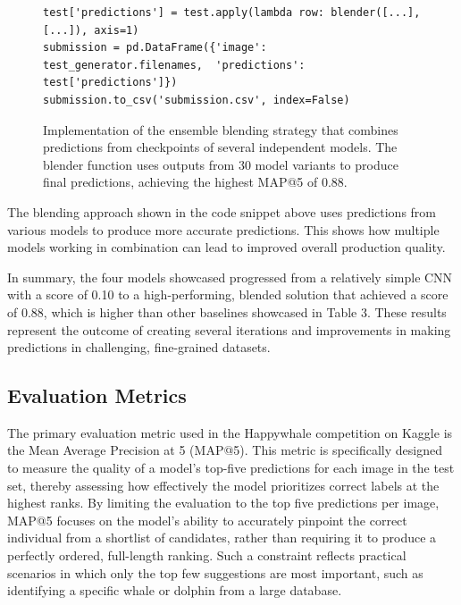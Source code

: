 \documentclass[twocolumn]{article}
\begin{document}
\begin{figure}[h!]
\centering
\begin{minipage}{0.99\linewidth}
\begin{lstlisting}
test['predictions'] = test.apply(lambda row: blender([...], [...]), axis=1)
submission = pd.DataFrame({'image': test_generator.filenames,  'predictions': test['predictions']})
submission.to_csv('submission.csv', index=False)
\end{lstlisting}
\end{minipage}
\caption{Implementation of the ensemble blending strategy that combines predictions from checkpoints of several independent models. The blender function uses outputs from 30 model variants to produce final predictions, achieving the highest MAP@5 of 0.88.}
\end{figure}

The blending approach shown in the code snippet above uses predictions from various models to produce more accurate predictions. This shows how multiple models working in combination can lead to improved overall production quality.

In summary, the four models showcased progressed from a relatively simple CNN with a score of 0.10 to a high-performing, blended solution that achieved a score of 0.88, which is higher than other baselines showcased in Table 3. These results represent the outcome of creating several iterations and improvements in making predictions in challenging, fine-grained datasets.

\subsection{Evaluation Metrics}

The primary evaluation metric used in the Happywhale competition on Kaggle is the Mean Average Precision at 5 (MAP@5). This metric is specifically designed to measure the quality of a model’s top-five predictions for each image in the test set, thereby assessing how effectively the model prioritizes correct labels at the highest ranks. By limiting the evaluation to the top five predictions per image, MAP@5 focuses on the model’s ability to accurately pinpoint the correct individual from a shortlist of candidates, rather than requiring it to produce a perfectly ordered, full-length ranking. Such a constraint reflects practical scenarios in which only the top few suggestions are most important, such as identifying a specific whale or dolphin from a large database. 
\end{document}
